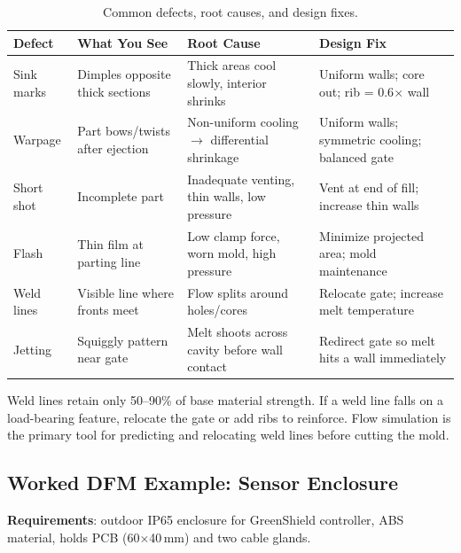 \documentclass[11pt,letterpaper,twoside,openany]{book}
\begin{document}
\begin{table}[htbp]
\centering\small
\begin{tabularx}{\textwidth}{l l X X}
  \toprule
  \textbf{Defect} & \textbf{What You See} & \textbf{Root Cause} & \textbf{Design Fix} \\
  \midrule
  Sink marks & Dimples opposite thick sections & Thick areas cool slowly, interior shrinks & Uniform walls; core out; rib = 0.6$\times$ wall \\
  Warpage & Part bows/twists after ejection & Non-uniform cooling $\to$ differential shrinkage & Uniform walls; symmetric cooling; balanced gate \\
  Short shot & Incomplete part & Inadequate venting, thin walls, low pressure & Vent at end of fill; increase thin walls \\
  Flash & Thin film at parting line & Low clamp force, worn mold, high pressure & Minimize projected area; mold maintenance \\
  Weld lines & Visible line where fronts meet & Flow splits around holes/cores & Relocate gate; increase melt temperature \\
  Jetting & Squiggly pattern near gate & Melt shoots across cavity before wall contact & Redirect gate so melt hits a wall immediately \\
  \bottomrule
\end{tabularx}
\caption{Common defects, root causes, and design fixes.}
\end{table}

\begin{tipbox}
Weld lines retain only 50--90\% of base material strength. If a weld line falls on a load-bearing feature, relocate the gate or add ribs to reinforce. Flow simulation is the primary tool for predicting and relocating weld lines before cutting the mold.
\end{tipbox}



\subsection{Worked DFM Example: Sensor Enclosure}
\textbf{Requirements}: outdoor IP65 enclosure for GreenShield controller, ABS material, holds PCB (60$\times$40\,mm) and two cable glands.
\end{document}
